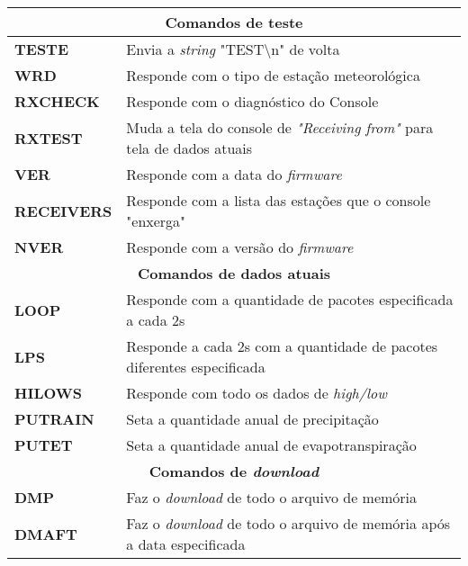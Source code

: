 \begin{anexosenv}
\begin{center}
\begin{longtable}{ll}
\multicolumn{2}{c}{\cellcolor{gray!25}\textbf{Comandos de teste}}                                                   		 \\ \hline
\textbf{TESTE}                            & Envia a \textit{string} "TEST\textbackslash n" de volta  \\ \hline
\textbf{WRD}                        & Responde com o tipo de estação meteorológica \\ \hline
\textbf{RXCHECK}                        & Responde com o diagnóstico do Console \\ \hline
\textbf{RXTEST}                       & Muda a tela do console de \textit{"Receiving from"} para tela de dados atuais                                                        \\ \hline
\textbf{VER}                           & Responde com a data do \textit{firmware}                                                             \\ \hline
\textbf{RECEIVERS}                    & Responde com a lista das estações que o console "enxerga" \\ \hline
\textbf{NVER}                       & Responde com a versão do \textit{firmware}                                                             \\ \hline
\multicolumn{2}{c}{\cellcolor{gray!25}\textbf{Comandos de dados atuais}}                                             \\ \hline
\textbf{LOOP}                     & Responde com a quantidade de pacotes especificada a cada 2s        \\ \hline
\textbf{LPS}                & Responde a cada 2s com a quantidade de pacotes diferentes especificada          \\ \hline
\textbf{HILOWS}                & Responde com todo os dados de \textit{high/low}                 \\ \hline
\textbf{PUTRAIN}                      & Seta a quantidade anual de precipitação \\ \hline
\textbf{PUTET}                 & Seta a quantidade anual de evapotranspiração        \\ \hline
\multicolumn{2}{c}{\cellcolor{gray!25}\textbf{Comandos de \textit{download}}}                                     		 \\ \hline
\textbf{DMP}                 & Faz o \textit{download} de todo o arquivo de memória \\ \hline
\textbf{DMAFT}                   & Faz o \textit{download} de todo o arquivo de memória após a data especificada \\ \hline

\end{longtable}
\end{center}
\end{anexosenv}
